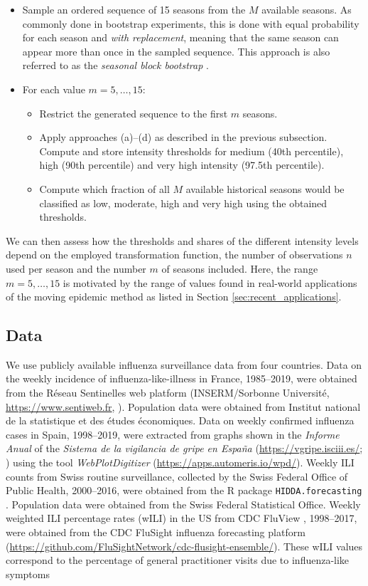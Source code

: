\documentclass{article}
\begin{document}
\begin{itemize}
\item Sample an ordered sequence of 15 seasons from the $M$ available seasons. As commonly done in bootstrap experiments, this is done with equal probability for each season and \textit{with replacement}, meaning that the same season can appear more than once in the sampled sequence. This approach is also referred to as the \textit{seasonal block bootstrap} \citep{Politis2001}.
\item For each value $m = 5, \dots, 15$:
\begin{itemize}
\item Restrict the generated sequence to the first $m$ seasons.
\item Apply approaches (a)--(d) as described in the previous subsection. Compute and store intensity thresholds for medium (40th percentile), high (90th percentile) and very high intensity (97.5th percentile).
\item Compute which fraction of all $M$ available historical seasons would be classified as low, moderate, high and very high using the obtained thresholds.
\end{itemize}
\end{itemize}
We can then assess how the thresholds and shares of the different intensity levels depend on the employed transformation function, the number of observations $n$ used per season and the number $m$ of seasons included. Here, the range $m =5, \dots, 15$ is motivated by the range of values found in real-world applications of the moving epidemic method as listed in Section \ref{sec:recent_applications}.

\subsection{Data}

We use publicly available influenza surveillance data from four countries. Data on the weekly incidence of influenza-like-illness in France, 1985--2019, were obtained from the Réseau Sentinelles web platform (INSERM/Sorbonne Université, \url{https://www.sentiweb.fr}, \citealt{Flahault2006}). Population data were obtained from Institut national de la statistique et des études économiques. Data on weekly confirmed influenza cases in Spain, 1998--2019, were extracted from graphs shown in the \textit{Informe Anual} of the \textit{Sistema de la vigilancia de gripe en Espa\~na} (\url{https://vgripe.isciii.es/}; \citealt{SVGE2019}) using the tool \textit{WebPlotDigitizer} (\url{https://apps.automeris.io/wpd/}). Weekly ILI counts from Swiss routine surveillance, collected by the Swiss Federal Office of Public Health, 2000--2016, were obtained from the R package \texttt{HIDDA.forecasting} \citep{Held2019}. Population data were obtained from the Swiss Federal Statistical Office. Weekly weighted ILI percentage rates (wILI) in the US from CDC FluView \citep{Charbonneau2019}, 1998--2017, were obtained from the CDC FluSight influenza forecasting platform (\url{https://github.com/FluSightNetwork/cdc-flusight-ensemble/}). These wILI values correspond to the percentage of general practitioner visits due to influenza-like symptoms
\end{document}
